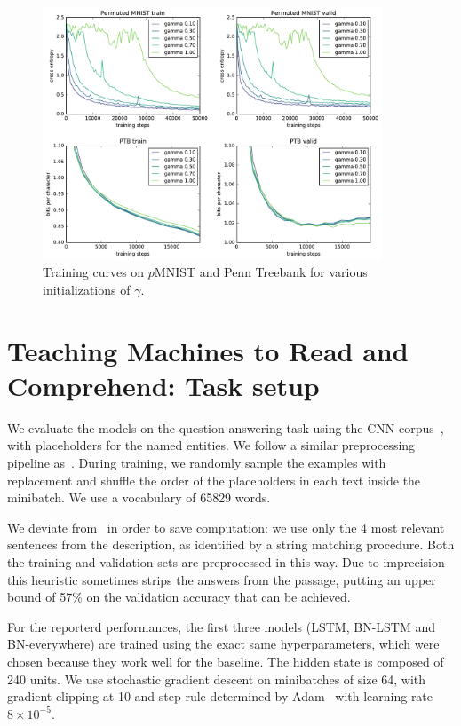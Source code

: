 \documentclass{article} %
\begin{document}
\begin{figure}[!h]
\center
\includegraphics[width=0.9\textwidth]{figures/gammas.pdf}
\caption{Training curves on $p$MNIST and Penn Treebank for various initializations of $\gamma$.}
\label{fig:gammas}
\end{figure}

\section{Teaching Machines to Read and Comprehend: Task setup} \label{sec:more-attr}

We evaluate the models on the question answering task using the CNN corpus~\citep{attentivereader},
with placeholders for the named entities. We follow a similar preprocessing
pipeline as~\citet{attentivereader}.  During training, we randomly sample the
examples with replacement and shuffle the order of the placeholders in each
text inside the minibatch.  We use a vocabulary of 65829 words.

We deviate from~\citet{attentivereader} in order to save computation:
we use only the 4 most relevant sentences from the description,
as identified by a string matching procedure.
Both the training and validation sets are preprocessed in this way.
Due to imprecision this heuristic sometimes strips the answers from the passage,
putting an upper bound of 57\% on the validation accuracy that can be achieved.

For the reporterd performances, the first three models (LSTM, BN-LSTM and BN-everywhere) are trained using the
exact same hyperparameters, which were chosen because they work well for the
baseline.  The hidden state is composed of 240 units.  We use stochastic
gradient descent on minibatches of size 64, with gradient clipping at 10 and
step rule determined by Adam~\citep{kingma2014adam} with learning rate $8
\times 10^{-5}$.
\end{document}

